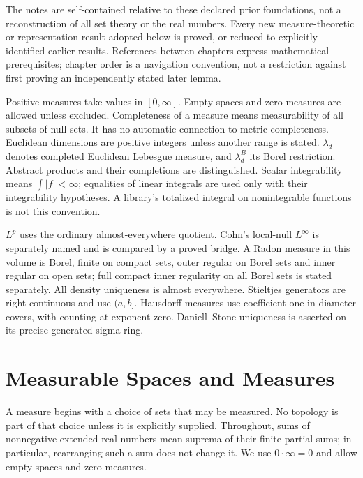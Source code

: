 \documentclass[11pt,oneside,openany]{book}
\theoremstyle{definition}
\theoremstyle{remark}
\newcounter{foundation}\renewcommand{\thefoundation}{F\arabic{foundation}}
\begin{document}
The notes are self-contained relative to these declared prior foundations,
not a reconstruction of all set theory or the real numbers. Every new
measure-theoretic or representation result adopted below is proved, or reduced
to explicitly identified earlier results. References between chapters express
mathematical prerequisites; chapter order is a navigation convention, not a
restriction against first proving an independently stated later lemma.

Positive measures take values in $[0,\infty]$. Empty spaces and zero measures
are allowed unless excluded. Completeness of a measure means measurability of
all subsets of null sets. It has no automatic connection to metric completeness.
Euclidean dimensions are positive integers unless another range is stated.
$\lambda_d$ denotes completed Euclidean Lebesgue measure, and
$\lambda_d^B$ its Borel restriction. Abstract products and their completions
are distinguished. Scalar integrability means $\int|f|<\infty$; equalities of
linear integrals are used only with their integrability hypotheses. A library's
totalized integral on nonintegrable functions is not this convention.

$L^p$ uses the ordinary almost-everywhere quotient. Cohn's local-null
$L^\infty$ is separately named and is compared by a proved bridge. A Radon
measure in this volume is Borel, finite on compact sets, outer regular on Borel
sets and inner regular on open sets; full compact inner regularity on all Borel
sets is stated separately. All density uniqueness is almost everywhere.
Stieltjes generators are right-continuous and use $(a,b]$. Hausdorff measures
use coefficient one in diameter covers, with counting at exponent zero.
Daniell--Stone uniqueness is asserted on its precise generated sigma-ring.


\mainmatter

\chapter{Measurable Spaces and Measures}\label{ch:d11-01}

A measure begins with a choice of sets that may be measured. No topology is
part of that choice unless it is explicitly supplied. Throughout, sums of
nonnegative extended real numbers mean suprema of their finite partial sums;
in particular, rearranging such a sum does not change it. We use
$0\cdot\infty=0$ and allow empty spaces and zero measures.
\end{document}
